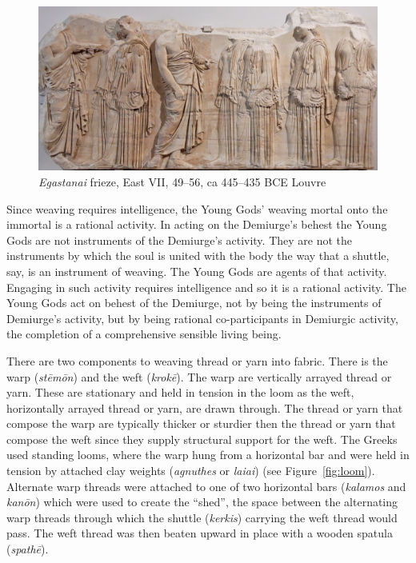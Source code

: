 \begin{figure}[htbp]
     \centering
         \includegraphics[scale=1.4]{graphics/egastinai_frieze.jpg}
     \caption{\emph{Egastanai} frieze, East VII, 49--56, ca 445--435 BCE Louvre}
     \label{fig:frieze}
\end{figure}

Since weaving requires intelligence, the Young Gods' weaving mortal onto the immortal is a rational activity. In acting on the Demiurge's behest the Young Gods are not instruments of the Demiurge's activity. They are not the instruments by which the soul is united with the body the way that a shuttle, say, is an instrument of weaving. The Young Gods are agents of that activity. Engaging in such activity requires intelligence and so it is a rational activity. The Young Gods act on behest of the Demiurge, not by being the instruments of Demiurge's activity, but by being rational co-participants in Demiurgic activity, the completion of a comprehensive sensible living being. 

There are two components to weaving thread or yarn into fabric. There is the warp (\emph{stēmōn}) and the weft (\emph{krokē}). The warp are vertically arrayed thread or yarn. These are stationary and held in tension in the loom as the weft, horizontally arrayed thread or yarn, are drawn through. The thread or yarn that compose the warp are typically thicker or sturdier then the thread or yarn that compose the weft since they supply structural support for the weft. The Greeks used standing looms, where the warp hung from a horizontal bar and were held in tension by attached clay weights (\emph{agnuthes} or \emph{laiai}) (see Figure~\ref{fig:loom}). Alternate warp threads were attached to one of two horizontal bars (\emph{kalamos} and \emph{kanōn}) which were used to create the ``shed'', the space between the alternating warp threads through which the shuttle (\emph{kerkis}) carrying the weft thread would pass. The weft thread was then beaten upward in place with a wooden spatula (\emph{spathē}). 

